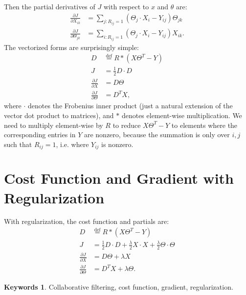 \documentclass[12pt]{article}
\theoremstyle{plain}
\theoremstyle{definition}
\newtheorem*{keywords}{Keywords}
\theoremstyle{remark}
\newcommand{\defeq}{\overset{\mathrm{def}}{=}}
\begin{document}
Then the partial derivatives of $J$ with respect to $x$ and $\theta$ are: 
\begin{align*}
\frac{\partial J}{\partial X_{ik}} &= \sum_{j:R_{ij}=1} (\Theta_j \cdot X_i - Y_{ij}) \Theta_{jk} \\
\frac{\partial J}{\partial \Theta_{jk}} &= \sum_{i:R_{ij}=1} (\Theta_j \cdot X_i - Y_{ij}) X_{ik}.
\end{align*}
The vectorized forms are surprisingly simple:
\begin{align*}
D &\defeq R * (X \Theta^T - Y) \\
J &= \frac{1}{2}D \cdot D \\
\frac{\partial J}{\partial X} &= D \Theta \\
\frac{\partial J}{\partial \Theta} &= D^T X,
\end{align*}
where $\cdot$ denotes the Frobenius inner product (just a natural extension of the vector dot product to matrices), and $*$ denotes element-wise multiplication. We need to multiply element-wise by $R$ to reduce $X\Theta^T - Y$ to elements where the corresponding entries in $Y$ are nonzero, because the summation is only over $i,j$ such that $R_{ij} = 1$, i.e. where $Y_{ij}$ is nonzero.

\section{Cost Function and Gradient with Regularization}

With regularization, the cost function and partials are: 
\begin{align*}
D &\defeq R * (X \Theta^T - Y) \\
J &= \frac{1}{2}D \cdot D + \frac{\lambda}{2} X \cdot X + \frac{\lambda}{2} \Theta \cdot \Theta \\
\frac{\partial J}{\partial X} &= D \Theta + \lambda X \\
\frac{\partial J}{\partial \Theta} &= D^T X + \lambda \Theta.
\end{align*}

\begin{keywords}
Collaborative filtering, cost function, gradient, regularization.
\end{keywords}
\end{document}
